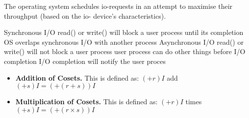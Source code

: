 \begin{figure}[h]
\end{figure}

The operating system schedules io-requests in an attempt to maximise their throughput (based on the io- device’s characteristics).

Synchronous I/O read() or write() will block a user process until its completion 
OS overlaps synchronous I/O with another process 
Asynchronous I/O read() or write() will not block a user process 
user process can do other things before I/O completion 
I/O completion will notify the user proces

\begin{itemize}   
\renewcommand{\labelitemi}{$\Box$}
\item \textbf{Addition of Cosets.} This is defined as: $(+r)I$ add $(+s)I = (+(r+s))I$
\item \textbf{Multiplication of Cosets.}  This is defined as: $(+r)I$ times $(+s)I = (+(r\times s))I$
\end{itemize}

